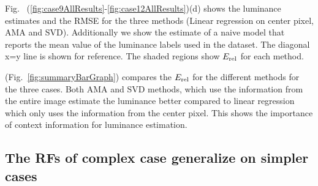 \documentclass{jov}
\begin{document}
Fig.~ (\ref{fig:case9AllResults}-\ref{fig:case12AllResults})(d) shows the luminance estimates and the RMSE for the three methods (Linear regression on center pixel, AMA and SVD). Additionally we show the estimate of a naive model that reports the mean value of the luminance labels used in the dataset. The diagonal x=y line is shown for reference. The shaded regions show $E_{\rm rel}$ for each method.

(Fig.~\ref{fig:summaryBarGraph}) compares the $E_{\rm rel}$ for the different methods for the three cases. Both AMA and SVD methods, which use the information from the entire image estimate the luminance better compared to linear regression which only uses the information from the center pixel. This shows the importance of context information for luminance estimation.

\subsection{The RFs of complex case generalize on simpler cases}
\end{document}
